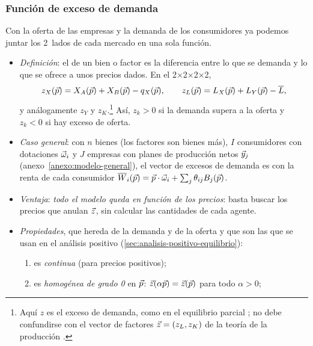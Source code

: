 \documentclass[11pt]{article}
\begin{document}
\subsubsection{Función de exceso de demanda}\label{sec:funcion-exceso-demanda}

Con la oferta de las empresas y la demanda de los consumidores ya podemos juntar los 2~lados de cada mercado en una sola función.

\begin{itemize}
\item \emph{Definición}: el  de un bien o factor es la diferencia entre lo que se demanda y lo que se ofrece a unos precios dados. En el 2×2×2×2,
  \begin{equation}
  z_X(\vec{p})=X_A(\vec{p})+X_B(\vec{p})-q_X(\vec{p}),\qquad z_L(\vec{p})=L_X(\vec{p})+L_Y(\vec{p})-\overline{L}, \label{eq:exceso}
  \end{equation}
  y análogamente $z_Y$ y $z_K$.\footnote{Aquí $z$ es el exceso de demanda, como en el equilibrio parcial ; no debe confundirse con el vector de factores $\vec{z}=(z_L,z_K)$ de la teoría de la producción .} Así, $z_k>0$ si la demanda supera a la oferta y $z_k<0$ si hay exceso de oferta.
\item \emph{Caso general}: con $n$ bienes (los factores son bienes más), $I$ consumidores con dotaciones $\vec{\omega}_i$ y $J$ empresas con planes de producción netos $\vec{y}_j$ (anexo~\ref{anexo:modelo-general}), el vector de excesos de demanda es
  con la renta de cada consumidor $\overline{W}_i(\vec{p})=\vec{p}\cdot\vec{\omega}_i+\sum_{j}\theta_{ij}B_j(\vec{p})$.
\item \emph{Ventaja}: \emph{todo el modelo queda en función de los precios}: basta buscar los precios que anulan $\vec{z}$, sin calcular las cantidades de cada agente.
\item \emph{Propiedades}, que hereda de la demanda y de la oferta y que son las que se usan en el análisis positivo (\ref{sec:analisis-positivo-equilibrio}):
  \begin{enumerate}
  \item es \emph{continua} (para precios positivos);
  \item es \emph{homogénea de grado 0} en $\vec{p}$: $\vec{z}(\alpha\vec{p})=\vec{z}(\vec{p})$ para todo $\alpha>0$;

\end{enumerate}
\end{itemize}
\end{document}
